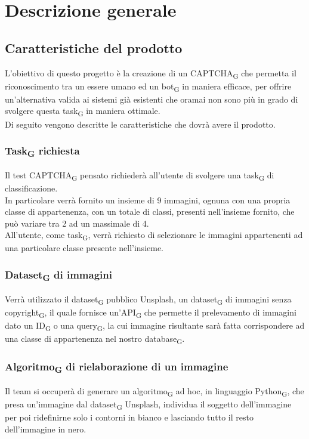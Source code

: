 \section{Descrizione generale}

\subsection{Caratteristiche del prodotto}
L'obiettivo di questo progetto è la creazione di un CAPTCHA\textsubscript{G} che permetta il riconoscimento tra un essere umano ed un bot\textsubscript{G} in maniera efficace, per offrire un'alternativa valida ai sistemi già esistenti che oramai non sono più in grado di svolgere questa task\textsubscript{G} in maniera ottimale.\\

\noindent Di seguito vengono descritte le caratteristiche che dovrà avere il prodotto.

\subsubsection{Task\textsubscript{G} richiesta}
Il test CAPTCHA\textsubscript{G} pensato richiederà all'utente di svolgere una task\textsubscript{G} di classificazione.\\
In particolare verrà fornito un insieme di 9 immagini, ognuna con una propria classe di appartenenza, con un totale di classi, presenti nell'insieme fornito, che può variare tra 2 ad un massimale di 4.\\
All'utente, come task\textsubscript{G}, verrà richiesto di selezionare le immagini appartenenti ad una particolare classe presente nell'insieme.

\subsubsection{Dataset\textsubscript{G} di immagini}
Verrà utilizzato il dataset\textsubscript{G} pubblico Unsplash, un dataset\textsubscript{G} di immagini senza copyright\textsubscript{G}, il quale fornisce un'API\textsubscript{G} che permette il prelevamento di immagini dato un ID\textsubscript{G} o una query\textsubscript{G}, la cui immagine risultante sarà fatta corrispondere ad una classe di appartenenza nel nostro database\textsubscript{G}.

\subsubsection{Algoritmo\textsubscript{G} di rielaborazione di un immagine}
Il team si occuperà di generare un algoritmo\textsubscript{G} ad hoc, in linguaggio Python\textsubscript{G}, che presa un'immagine dal dataset\textsubscript{G} Unsplash, individua il soggetto dell'immagine per poi ridefinirne solo i contorni in bianco e lasciando tutto il resto dell'immagine in nero.  

